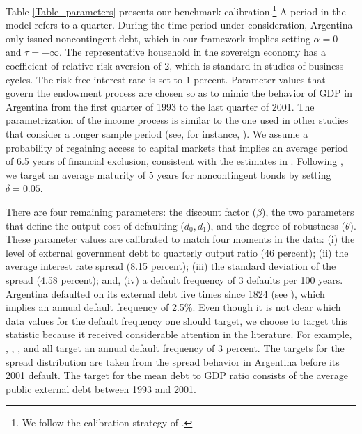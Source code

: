 Table \ref{Table_parameters} presents our benchmark calibration.\footnote{We follow the calibration strategy of \cite{PouzoPresno2016}.} A period in the model refers to a quarter. During the time period under consideration, Argentina only issued noncontingent debt, which in our framework implies setting $\alpha=0$ and $\tau  =-\infty$. The representative household in the sovereign economy has a coefficient of relative risk aversion of 2, which is standard in studies of business cycles. The risk-free interest rate is set to 1 percent. Parameter values that govern the endowment process are chosen so as to mimic the behavior of GDP in Argentina from the first quarter of 1993 to the last quarter of 2001. The parametrization of the income process is similar to the one used in other studies that consider a longer sample period (see, for instance, \citealp{AG_06}). We assume a probability of regaining access to capital markets that implies an average period of 6.5 years of financial exclusion, consistent with the estimates in \cite{Benjamin}.  Following \cite{Chatty}, we target an average maturity of $5$ years for noncontingent bonds by setting $\delta = 0.05$.

There are four remaining parameters: the discount factor ($\beta$), the two parameters that define the output cost of defaulting ($d_0, d_1$), and the degree of robustness ($\theta$). These parameter values are calibrated to match four moments in the data: (i) the level of external government debt to quarterly output ratio (46 percent); (ii) the average interest rate spread (8.15 percent); (iii) the standard deviation of the spread (4.58 percent); and, (iv) a default frequency of 3 defaults per 100 years. Argentina defaulted on its external debt five times since 1824 (see \cite{Yue05}), which implies an annual default frequency of 2.5\%. Even though it is not clear which data values for the default frequency one should target, we choose to target this statistic because it received considerable attention in the literature. For example, \cite{AG_06}, \cite{Arellano05}, \cite{nota}, \cite{Lizarazo_default} and \cite{PouzoPresno2016} all target an annual default frequency of 3 percent. The targets for the spread distribution are taken from the spread behavior in Argentina before its 2001 default. The target for the mean debt to GDP ratio consists of the average public external debt between 1993 and 2001.





